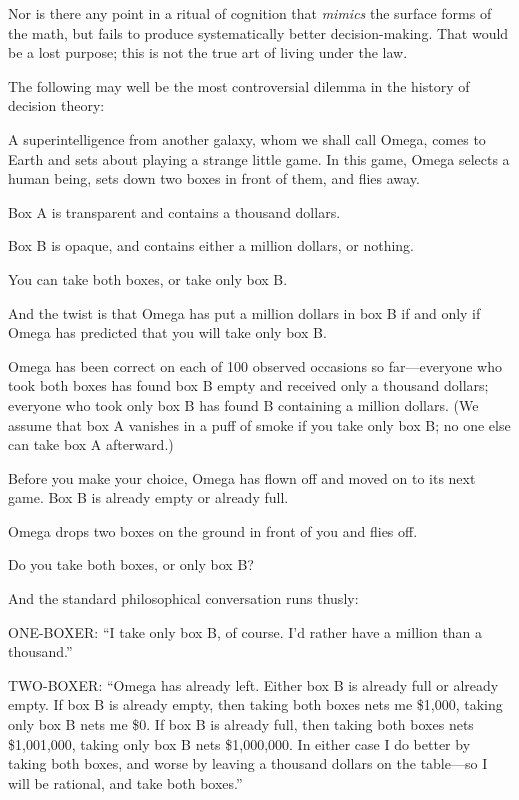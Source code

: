 {
 Nor is there any point in a ritual of cognition that
\textit{mimics} the surface forms of the math, but fails to produce
systematically better decision-making. That would be a lost purpose;
this is not the true art of living under the law.}

\myendsectiontext


{
 The following may well be the most controversial dilemma in the
history of decision theory:}

{
 A superintelligence from another galaxy, whom we shall call Omega,
comes to Earth and sets about playing a strange little game. In this
game, Omega selects a human being, sets down two boxes in front of
them, and flies away.}

{
 Box A is transparent and contains a thousand dollars.}

{
 Box B is opaque, and contains either a million dollars, or
nothing.}

{
 You can take both boxes, or take only box B.}

{
 And the twist is that Omega has put a million dollars in box B if
and only if Omega has predicted that you will take only box B.}

{
 Omega has been correct on each of 100 observed occasions so
far---everyone who took both boxes has found box B empty and received
only a thousand dollars; everyone who took only box B has found B
containing a million dollars. (We assume that box A vanishes in a puff
of smoke if you take only box B; no one else can take box A
afterward.)}

{
 Before you make your choice, Omega has flown off and moved on to
its next game. Box B is already empty or already full.}

{
 Omega drops two boxes on the ground in front of you and flies
off.}

{
 Do you take both boxes, or only box B?}

{
 And the standard philosophical conversation runs thusly:}

{
 ONE-BOXER: ``I take only box B, of course.
I'd rather have a million than a
thousand.''}

{
 TWO-BOXER: ``Omega has already left. Either box B
is already full or already empty. If box B is already empty, then
taking both boxes nets me \$1,000, taking only box B nets me \$0. If
box B is already full, then taking both boxes nets \$1,001,000, taking
only box B nets \$1,000,000. In either case I do better by taking both
boxes, and worse by leaving a thousand dollars on the table---so I will
be rational, and take both boxes.''}

